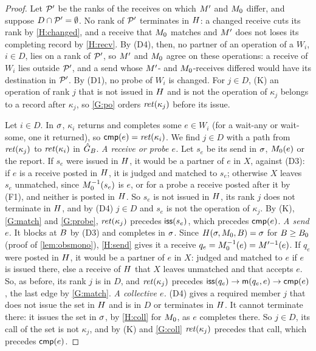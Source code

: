 \begin{proof}
Let $\mathcal{P}'$ be the ranks of the receives on which $M'$ and $M_0$ differ, and suppose
$D\cap \mathcal{P}'=\emptyset$. No rank of $\mathcal{P}'$ terminates in $H$: a changed receive cuts its rank by
\ref{H:changed}, and a receive that $M_0$ matches and $M'$ does not loses its completing
record by \ref{H:recv}. By (D4), then, no partner of an operation of a $W_i$, $i\in D$, lies on a
rank of $\mathcal{P}'$, so $M'$ and $M_0$ agree on these operations: a receive of $W_i$ lies outside
$\mathcal{P}'$, and a send whose $M'$- and $M_0$-receives differed would have its destination in
$\mathcal{P}'$. By (D1), no probe of $W_i$ is changed. For $j\in D$, (K) an operation of rank $j$ that is
not issued in $H$ and is not the operation of $\kappa_j$ belongs to a record after $\kappa_j$,
so \ref{G:po} orders $\mathit{ret}(\kappa_j)$ before its issue.

Let $i\in D$. In $\sigma$, $\kappa_i$ returns and completes some $e\in W_i$ (for a wait-any or
wait-some, one it returned), so $\mathsf{cmp}(e)=\mathit{ret}(\kappa_i)$. We find $j\in D$ with a path from
$\mathit{ret}(\kappa_j)$ to $\mathit{ret}(\kappa_i)$ in $\hat G_B$.
\emph{A receive or probe $e$.} Let $s_e$ be its send in $\sigma$, $M_0(e)$ or the report. If
$s_e$ were issued in $H$, it would be a partner of $e$ in $X$, against (D3): if $e$ is a
receive posted in $H$, it is judged and matched to $s_e$; otherwise $X$ leaves $s_e$
unmatched, since $M_0^{-1}(s_e)$ is $e$, or for a probe a receive posted after it by (F1), and
neither is posted in $H$. So $s_e$ is not issued in $H$, its rank $j$ does not terminate
in $H$, and by (D4) $j\in D$ and $s_e$ is not the operation of $\kappa_j$. By (K),
\ref{G:match} and \ref{G:probe}, $\mathit{ret}(\kappa_j)$ precedes $\mathsf{iss}(s_e)$, which precedes
$\mathsf{cmp}(e)$.
\emph{A send $e$.} It blocks at $B$ by (D3) and completes in $\sigma$. Since
$H(\sigma,M_0,B)=\sigma$ for $B\ge B_0$ (proof of \cref{lem:obsmono}), \ref{H:send}
gives it a receive $q_e=M_0^{-1}(e)=M'^{-1}(e)$. If $q_e$ were posted in $H$, it would be a partner
of $e$ in $X$: judged and matched to $e$ if $e$ is issued there, else a receive of $H$ that
$X$ leaves unmatched and that accepts $e$. So, as before, its rank $j$ is in $D$, and
$\mathit{ret}(\kappa_j)$ precedes $\mathsf{iss}(q_e)\to\mathsf{m}(q_e,e)\to\mathsf{cmp}(e)$, the last edge by
\ref{G:match}.
\emph{A collective $e$.} (D4) gives a required member $j$ that does not issue the set in
$H$ and is in $D$ or terminates in $H$. It cannot terminate there: it issues the set in
$\sigma$, by \ref{H:coll} for $M_0$, as $e$ completes there. So $j\in D$, its call of the set is
not $\kappa_j$, and by (K) and \ref{G:coll} $\mathit{ret}(\kappa_j)$ precedes that call, which precedes
$\mathsf{cmp}(e)$.


\end{proof}

